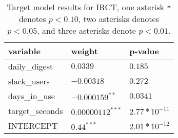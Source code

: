 \renewcommand{\arraystretch}{1.2}
\begin{table}
\begin{center}
\begin{tabular}{|p{6cm}|p{4cm}|p{4cm}|} 
\hline
variable & weight & p-value \\ [0.5ex]
\hline\hline

daily\_digest & $0.0339^{}$ & $0.185$ \\
slack\_users & $-0.00318^{}$ & $0.272$ \\
days\_in\_use & $-0.000159^{**}$ & $0.0341$ \\
target\_seconds & $0.00000112^{***}$ & $2.77*10^{-11}$ \\

\hline\hline
INTERCEPT & $0.44^{***}$ & $2.01*10^{-12}$ \\

\hline
\end{tabular}
\caption{Target model results for IRCT, one asterisk \texttt{*} denotes  $p < 0.10$, two asterisks denotes $p < 0.05$, and three asterisks denote $p < 0.01$.}
\label{tab:lmResults}
\end{center}
\end{table}